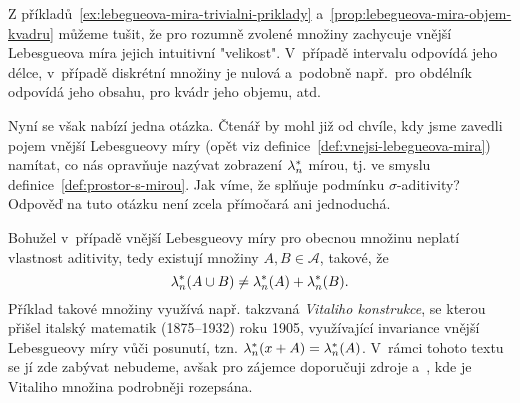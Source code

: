 Z příkladů~\ref{ex:lebegueova-mira-trivialni-priklady} a~\ref{prop:lebegueova-mira-objem-kvadru} můžeme tušit, že pro rozumně zvolené množiny zachycuje vnější Lebesgueova míra jejich intuitivní "velikost". V~případě intervalu odpovídá jeho délce, v~případě diskrétní množiny je nulová a~podobně např.~pro obdélník odpovídá jeho obsahu, pro kvádr jeho objemu, atd.

Nyní se však nabízí jedna otázka. Čtenář by mohl již od chvíle, kdy jsme zavedli pojem vnější Lebesgueovy míry (opět viz definice~\ref{def:vnejsi-lebegueova-mira}) namítat, co nás opravňuje nazývat zobrazení $\lambda_n^*$ mírou, tj. ve smyslu definice~\ref{def:prostor-s-mirou}. Jak víme, že splňuje podmínku $\sigma$-aditivity? Odpověď na tuto otázku není zcela přímočará ani jednoduchá.

Bohužel v~případě vnější Lebesgueovy míry pro obecnou množinu neplatí vlastnost aditivity, tedy existují množiny $A,B\in\mathcal{A}$, takové, že
\[\lambda_n^*(A\cup B)\neq\lambda_n^*(A)+\lambda_n^*(B).\]
Příklad takové množiny využívá např. takzvaná \emph{Vitaliho konstrukce}, se kterou přišel italský matematik  (1875--1932) roku 1905, využívající invariance vnější Lebesgueovy míry vůči posunutí, tzn. $\lambda_n^*(x+A)=\lambda_n^*(A)$. \cite{OConnor2025} V~rámci tohoto textu se jí zde zabývat nebudeme, avšak pro zájemce doporučuji zdroje \citep[str. 3]{Lukes2013} a~\cite{Verner2025}, kde je Vitaliho množina podrobněji rozepsána.

